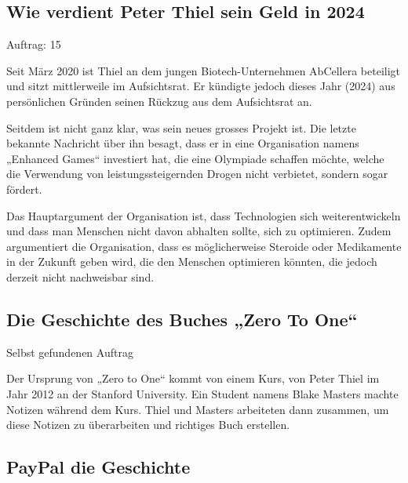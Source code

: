 \documentclass[10pt]{article}
\begin{document}
\subsection*{Wie verdient Peter Thiel sein Geld in 2024}

\begin{description}
    \item[Auftrag: 15]
\end{description}

Seit März 2020 ist Thiel an dem jungen Biotech-Unternehmen AbCellera beteiligt und sitzt mittlerweile im Aufsichtsrat. Er kündigte jedoch dieses Jahr (2024) aus persönlichen Gründen seinen Rückzug aus dem Aufsichtsrat an.

Seitdem ist nicht ganz klar, was sein neues grosses Projekt ist. Die letzte bekannte Nachricht über ihn besagt, dass er in eine Organisation namens „Enhanced Games“  investiert hat, die eine Olympiade schaffen möchte, welche die Verwendung von leistungssteigernden Drogen nicht verbietet, sondern sogar fördert.

Das Hauptargument der Organisation ist, dass Technologien sich weiterentwickeln und dass man Menschen nicht davon abhalten sollte, sich zu optimieren. Zudem argumentiert die Organisation, dass es möglicherweise Steroide oder Medikamente in der Zukunft geben wird, die den Menschen optimieren könnten, die jedoch derzeit nicht nachweisbar sind.

\subsection*{Die Geschichte des Buches „Zero To One“}

\begin{description}
    \item[Selbst gefundenen Auftrag]
\end{description}

Der Ursprung von „Zero to One“ kommt von einem Kurs, von Peter Thiel im Jahr 2012 an der Stanford University. Ein Student namens Blake Masters machte Notizen während dem Kurs. Thiel und Masters arbeiteten dann zusammen, um diese Notizen zu überarbeiten und richtiges Buch erstellen.

\subsection*{PayPal die Geschichte}
\end{document}
